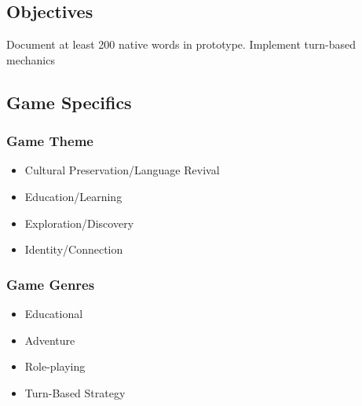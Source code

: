 \documentclass[11pt]{article}
\begin{document}
\subsection{Objectives}
Document at least 200 native words in prototype.
Implement turn-based mechanics

\subsection{Game Specifics}
\subsubsection{Game Theme}
\begin{itemize}
\item
  Cultural Preservation/Language Revival
\item
  Education/Learning
\item
  Exploration/Discovery
\item
  Identity/Connection
\end{itemize}

\subsubsection{Game Genres}
\begin{itemize}
\item
  Educational
\item
  Adventure
\item
  Role-playing
\item
  Turn-Based Strategy
\end{itemize}
  
\end{document}
